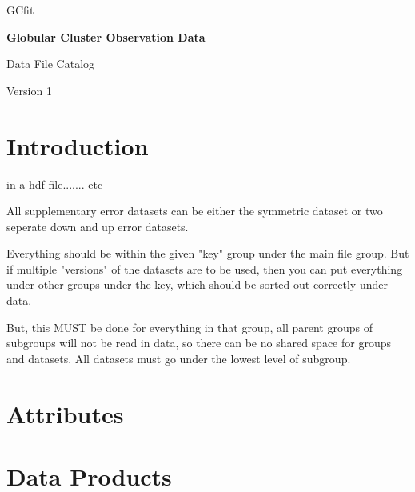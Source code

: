 \documentclass[12pt]{article}
\begin{document}
\begin{titlepage}
       \vspace*{2cm}

       \LARGE
        GCfit

       \vspace{2cm}

       \Huge
       \textbf{Globular Cluster Observation Data}

       \vspace{2cm}
        
        \LARGE
        Data File Catalog

       \vspace{1.5cm}

       \vfill

       Version 1
\end{titlepage}

\section{Introduction}

in a hdf file....... etc

All supplementary error datasets can be either the symmetric dataset or two
seperate down and up error datasets.

Everything should be within the given "key" group under the main file group.
But if multiple "versions" of the datasets are to be used, then you can put
everything under other groups under the key, which should be sorted out
correctly under data.

But, this MUST be done for everything in that group, all parent groups of
subgroups will not be read in data, so there can be no shared space for groups
and datasets. All datasets must go under the lowest level of subgroup.

\section{Attributes}



\section{Data Products}











\end{document}
